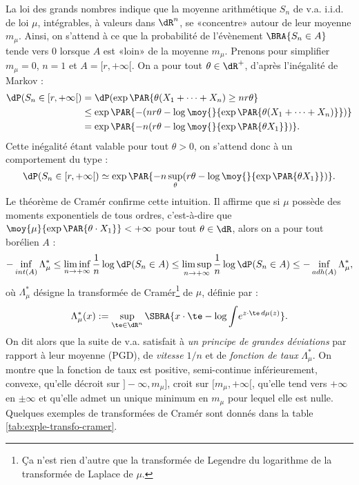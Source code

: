 La loi des grands nombres indique que la moyenne arithmétique $S_n$ de v.a.
i.i.d. de loi $\mu$, intégrables, à valeurs dans $\dR^n$, se «concentre»
autour de leur moyenne $m_\mu$. Ainsi, on s'attend à ce que la probabilité de
l'évènement $\BRA{S_n \in A}$ tende vers $0$ lorsque $A$ est «loin» de la
moyenne $m_\mu$. Prenons pour simplifier $m_\mu=0$, $n=1$ et $A=[r,+\infty[$.
On a pour tout $\theta\in\dR^+$, d'après l'inégalité de Markov :
\begin{align*}
\dP(S_n\in [r,+\infty[) 
 &= \dP(\exp\PAR{\theta (X_1+\cdots+X_n) \geq nr\theta}\\
 &\leq \exp\PAR{-(nr\theta-\log\moy{}{\exp\PAR{\theta (X_1+\cdots+X_n)}})}\\
 &= \exp\PAR{-n(r\theta-\log\moy{}{\exp\PAR{\theta X_1}})}.
\end{align*}
Cette inégalité étant valable pour tout $\theta>0$, on s'attend donc à un
comportement du type :
$$
\dP(S_n\in [r,+\infty[) \simeq 
\exp\PAR{-n\sup_\theta (r\theta-\log\moy{}{\exp\PAR{\theta X_1}})}.
$$
Le théorème de Cramér confirme cette intuition. Il affirme que si $\mu$
possède des moments exponentiels de tous ordres, c'est-à-dire que
$\moy{\mu}{\exp\PAR{\theta\cdot X_1}}<+\infty$ pour tout $\theta\in\dR$, alors
on a pour tout borélien $A$ :
$$
-\inf_{int(A)} \Lambda_\mu^*
\leq\liminf_{n\to+\infty} \frac{1}{n}\log\dP(S_n\in A)
\leq\limsup_{n\to+\infty} \frac{1}{n}\log\dP(S_n\in A)
\leq-\inf_{adh(A)} \Lambda_\mu^*,
$$
où $\Lambda_\mu^*$ désigne la transformée de Cramér\footnote{Ça n'est rien d'autre
  que la transformée de Legendre du logarithme de la transformée de Laplace de
  $\mu$.}  de $\mu$, définie par :
$$
\Lambda_\mu^*(x)
:=\sup_{\te\in\dR^n}\SBRA{x\cdot\te - \log\int\!e^{z\cdot\te\,d\mu(z)}}.
$$
On dit alors que la suite de v.a. satisfait à \emph{un principe de grandes
  déviations} par rapport à leur moyenne (PGD), de \emph{vitesse} $1/n$ et de
\emph{fonction de taux} $\Lambda_\mu^*$. On montre que la fonction de taux est
positive, semi-continue inférieurement, convexe, qu'elle décroit sur
$]-\infty,m_\mu]$, croit sur $[m_\mu,+\infty[$, qu'elle tend vers $+\infty$ en
$±\infty$ et qu'elle admet un unique minimum en $m_\mu$ pour lequel elle est
nulle. Quelques exemples de transformées de Cramér sont donnés dans la table
\ref{tab:exple-transfo-cramer}.

